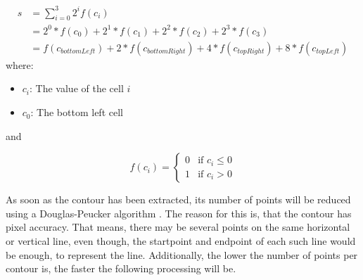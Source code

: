 \newenvironment{conditions}
  {\par\vspace{\abovedisplayskip}\noindent\begin{tabular}{>{$}l<{$} @{${}={}$} l}}
  {\end{tabular}\par\vspace{\belowdisplayskip}}

\begin{equation}
\begin{split}
	s	&= \displaystyle\sum_{i=0}^3 2^i f(c_i) \\
		&= 2^0 * f(c_0) + 2^1 * f(c_1) + 2^2 * f(c_2) + 2^3 * f(c_3) \\
		&= f(c_{bottomLeft}) + 2 * f(c_{bottomRight}) + 4 * f(c_{topRight}) + 8 * f(c_{topLeft})
	\label{equ:challenges:marching_squares_state}
\end{split}
\end{equation}
where:
\begin{itemize}[label=]
    \item $c_i$: The value of the cell $i$
    \item $c_0$: The bottom left cell
\end{itemize}

and

\[ f(c_i) =
  \begin{cases}
    0  & \text{if $c_i \leq 0$}\\
    1  & \text{if $c_i > 0$}
  \end{cases}
\]


As soon as the contour has been extracted, its number of points will be reduced using a Douglas-Peucker algorithm \cite{DOUGLAS.1973}. The reason for this is, that the contour has pixel accuracy. That means, there may be several points on the same horizontal or vertical line, even though, the startpoint and endpoint of each such line would be enough, to represent the line. Additionally, the lower the number of points per contour is, the faster the following processing will be.

